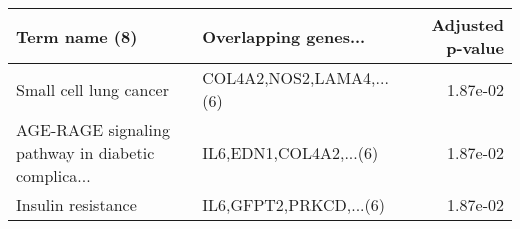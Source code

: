 \begin{tabular}{llr}
\toprule
                                     Term name (8) &     Overlapping genes... &  Adjusted p-value \\
\midrule
                            Small cell lung cancer & COL4A2,NOS2,LAMA4,...(6) &          1.87e-02 \\
AGE-RAGE signaling pathway in diabetic complica... &   IL6,EDN1,COL4A2,...(6) &          1.87e-02 \\
                                Insulin resistance &   IL6,GFPT2,PRKCD,...(6) &          1.87e-02 \\
\bottomrule
\end{tabular}
